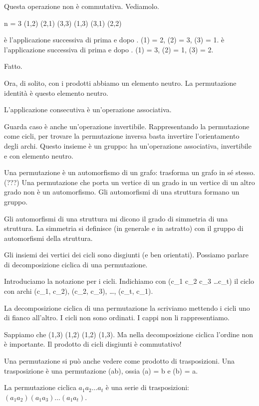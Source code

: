 Questa operazione non \`e commutativa.
Vediamolo.

n = 3
\pi (1,2) (2,1) (3,3)
\rho (1,3) (3,1) (2,2)

\pi \rho \`e l'applicazione successiva di prima \pi e dopo \rho.
\pi \rho (1) = 2, \pi \rho (2) = 3, \pi \rho (3) = 1.
\rho \pi \`e l'applicazione successiva di prima \rho e dopo \pi.
\rho \pi (1) = 3, \rho \pi (2) = 1, \rho \pi (3) = 2.

Fatto.

Ora, di solito, con i prodotti abbiamo un elemento neutro.
La permutazione identit\`a \`e questo elemento neutro.

L'applicazione consecutiva \`e un'operazione associativa.


Guarda caso \`e anche un'operazione invertibile.
Rappresentando la permutazione come cicli, per trovare la permutazione inversa basta invertire l'orientamento degli archi.
Questo insieme \`e un gruppo: ha un'operazione associativa, invertibile e con elemento neutro.


Una permutazione \`e un automorfismo di un grafo: trasforma un grafo in s\'e stesso.
(???)
Una permutazione che porta un vertice di un grado in un vertice di un altro grado non \`e un automorfismo.
Gli automorfismi di una struttura formano un gruppo.

Gli automorfismi di una struttura mi dicono il grado di simmetria di una struttura.
La simmetria si definisce (in generale e in astratto) con il gruppo di automorfismi della struttura.

Gli insiemi dei vertici dei cicli sono disgiunti (e ben orientati).
Possiamo parlare di decomposizione ciclica di una permutazione.

Introduciamo la notazione per i cicli.
Indichiamo con (c_1 c_2 c_3 \dots c_t) il ciclo con archi (c_1, c_2), (c_2, c_3), \dots, (c_t, c_1).

La decomposizione ciclica di una permutazione la scriviamo mettendo i cicli uno di fianco all'altro.
I cicli non sono ordinati.
I cappi non li rappresentiamo.

Sappiamo che (1,3) (1,2) \neq (1,2) (1,3).
Ma nella decomposizione ciclica l'ordine non \`e importante.
Il prodotto di cicli disgiunti \`e commutativo!

Una permutazione si pu\`o anche vedere come prodotto di trasposizioni.
Una trasposizione \tau \`e una permutazione (ab), ossia \tau(a) = b e \tau(b) = a.

\begin{oss}
	La permutazione ciclica $a_1 a_2 \dots a_t$ \`e una serie di trasposizioni: $(a_1 a_2) (a_1 a_3) \dots (a_1 a_t)$.
\end{oss}

